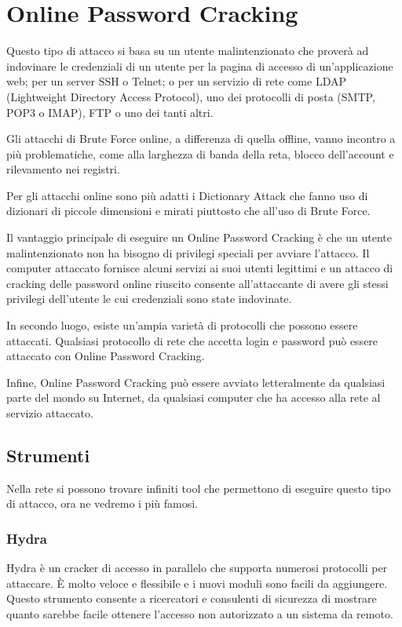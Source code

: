 \chapter{Online Password Cracking}

Questo tipo di attacco si basa su un utente malintenzionato che proverà ad indovinare le credenziali di un utente per la pagina di accesso di un'applicazione web; per un server SSH o Telnet; o per un servizio di rete come LDAP (Lightweight Directory Access Protocol), uno dei protocolli di posta (SMTP, POP3 o IMAP), FTP o uno dei tanti altri.

Gli attacchi di Brute Force online, a differenza di quella offline, vanno incontro a più problematiche, come alla larghezza di banda della reta, blocco dell'account e rilevamento nei registri.

Per gli attacchi online sono più adatti i Dictionary Attack che fanno uso di dizionari di piccole dimensioni e mirati piuttosto che all'uso di Brute Force.

Il vantaggio principale di eseguire un Online Password Cracking è che un utente malintenzionato non ha bisogno di privilegi speciali per avviare l'attacco. Il computer attaccato fornisce alcuni servizi ai suoi utenti legittimi e un attacco di cracking delle password online riuscito consente all'attaccante di avere gli stessi privilegi dell'utente le cui credenziali sono state indovinate.

In secondo luogo, esiste un'ampia varietà di protocolli che possono essere attaccati. Qualsiasi protocollo di rete che accetta login e password può essere attaccato con Online Password Cracking.

Infine, Online Password Cracking può essere avviato letteralmente da qualsiasi parte del mondo su Internet, da qualsiasi computer che ha accesso alla rete al servizio attaccato.

\section{Strumenti}

Nella rete si possono trovare infiniti tool che permettono di eseguire questo tipo di attacco, ora ne vedremo i più famosi.

\subsection{Hydra}

Hydra è un cracker di accesso in parallelo che supporta numerosi protocolli per attaccare. È molto veloce e flessibile e i nuovi moduli sono facili da aggiungere. Questo strumento consente a ricercatori e consulenti di sicurezza di mostrare quanto sarebbe facile ottenere l'accesso non autorizzato a un sistema da remoto.

